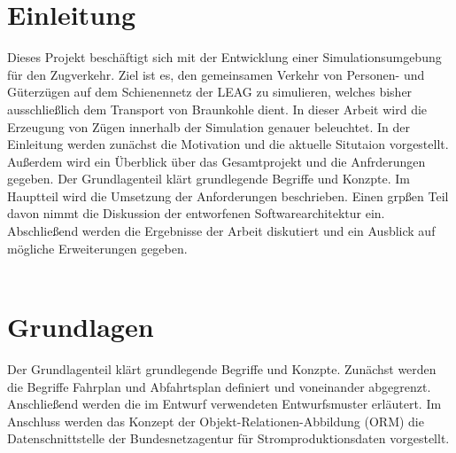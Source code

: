 \documentclass{scrbook} %
\begin{document}
	\ifisbook\fi
	\ifisbook\cleardoubleemptypage\fi

	
	\ifisbook\cleardoubleemptypage\fi
	\tableofcontents
	\cleardoublepage


	\chapter{Einleitung}
	Dieses Projekt beschäftigt sich mit der Entwicklung einer Simulationsumgebung für den Zugverkehr. Ziel ist es, den gemeinsamen Verkehr von Personen- und Güterzügen auf dem Schienennetz der LEAG zu simulieren, welches bisher ausschließlich dem Transport von Braunkohle dient. In dieser Arbeit wird die Erzeugung von Zügen innerhalb der Simulation genauer beleuchtet. In der Einleitung werden zunächst die Motivation und die aktuelle Situtaion vorgestellt. Außerdem wird ein Überblick über das Gesamtprojekt und die Anfrderungen gegeben. Der Grundlagenteil klärt grundlegende Begriffe und Konzpte. Im Hauptteil wird die Umsetzung der Anforderungen beschrieben. Einen grpßen Teil davon nimmt die Diskussion der entworfenen Softwarearchitektur ein. Abschließend werden die Ergebnisse der Arbeit diskutiert und ein Ausblick auf mögliche Erweiterungen gegeben.\\
	\\
	
	
	
	
	

	\chapter{Grundlagen}
	Der Grundlagenteil klärt grundlegende Begriffe und Konzpte. Zunächst werden die Begriffe Fahrplan und Abfahrtsplan definiert und voneinander abgegrenzt. Anschließend werden die im Entwurf verwendeten Entwurfsmuster erläutert. Im Anschluss werden das Konzept der Objekt-Relationen-Abbildung (ORM) die Datenschnittstelle der Bundesnetzagentur für Stromproduktionsdaten vorgestellt.\\
	\\
	
	
	
	
	
\end{document}
